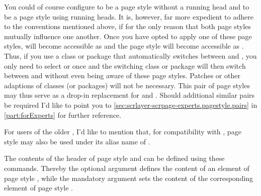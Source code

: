 You could of course configure  to be a page style
without a running head and  to be a page style
using running heads. It is, however, far more expedient to adhere to the
conventions mentioned above, if for the only reason that both page styles
mutually influence one another.  Once you have opted to apply one of these
page styles,  will become accessible as
 and the page style  will
become accessible as . Thus, if you use a class or package
that automatically switches between  and
, you only need to select  or
 once and the switching class or package will
then switch between  and 
without even being aware of these page styles. Patches or other adaptions of
classes (or packages) will not be necessary. This pair of page styles may thus
serve as a drop-in replacement for  and .
Should additional similar pairs be required I'd like to point you to
\autoref{sec:scrlayer-scrpage-experts.pagestyle.pairs} in
\autoref{part:forExperts} for further reference.

For users of the older , I'd like to mention that, for
compatibility with , page style
 may also be used under its alias name of
.%
%
\EndIndexGroup


\begin{Declaration}
\end{Declaration}
The contents of the header of page style  and
 can be defined using these commands. Thereby the
optional argument defines the content of an element of page style
, while the mandatory argument sets the content
of the corresponding element of page style .

